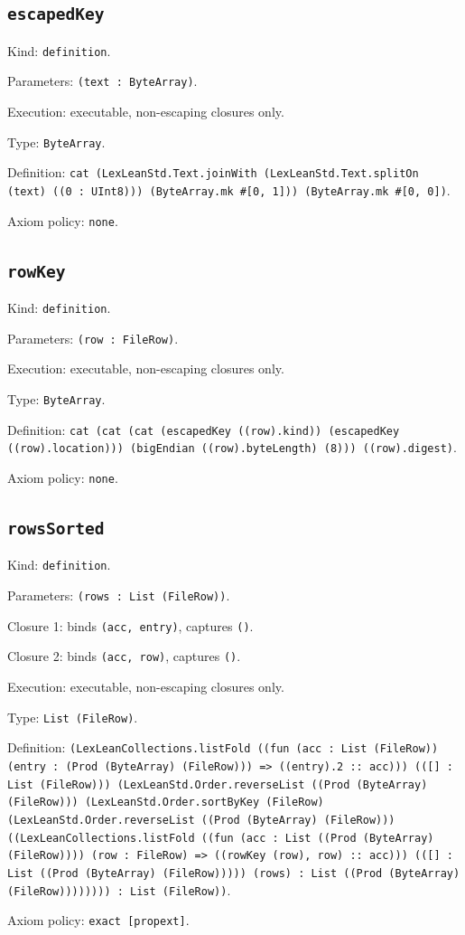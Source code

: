 \documentclass[11pt]{article}
\begin{document}
\subsection*{\texttt{escapedKey}}
\noindent Kind: \texttt{definition}.\par
\noindent Parameters: \texttt{(text : ByteArray)}.\par
\noindent Execution: executable, non-escaping closures only.\par
\noindent Type: \texttt{ByteArray}.\par
\noindent Definition: \texttt{cat (LexLeanStd.Text.joinWith (LexLeanStd.Text.splitOn (text) ((0 : UInt8))) (ByteArray.mk \#[0, 1])) (ByteArray.mk \#[0, 0])}.\par
\noindent Axiom policy: \texttt{none}.\par
\subsection*{\texttt{rowKey}}
\noindent Kind: \texttt{definition}.\par
\noindent Parameters: \texttt{(row : FileRow)}.\par
\noindent Execution: executable, non-escaping closures only.\par
\noindent Type: \texttt{ByteArray}.\par
\noindent Definition: \texttt{cat (cat (cat (escapedKey ((row).kind)) (escapedKey ((row).location))) (bigEndian ((row).byteLength) (8))) ((row).digest)}.\par
\noindent Axiom policy: \texttt{none}.\par
\subsection*{\texttt{rowsSorted}}
\noindent Kind: \texttt{definition}.\par
\noindent Parameters: \texttt{(rows : List (FileRow))}.\par
\noindent Closure 1: binds \texttt{(acc, entry)}, captures \texttt{()}.\par
\noindent Closure 2: binds \texttt{(acc, row)}, captures \texttt{()}.\par
\noindent Execution: executable, non-escaping closures only.\par
\noindent Type: \texttt{List (FileRow)}.\par
\noindent Definition: \texttt{(LexLeanCollections.listFold ((fun (acc : List (FileRow)) (entry : (Prod (ByteArray) (FileRow))) => ((entry).2 :: acc))) (([] : List (FileRow))) (LexLeanStd.Order.reverseList ((Prod (ByteArray) (FileRow))) (LexLeanStd.Order.sortByKey (FileRow) (LexLeanStd.Order.reverseList ((Prod (ByteArray) (FileRow))) ((LexLeanCollections.listFold ((fun (acc : List ((Prod (ByteArray) (FileRow)))) (row : FileRow) => ((rowKey (row), row) :: acc))) (([] : List ((Prod (ByteArray) (FileRow))))) (rows) : List ((Prod (ByteArray) (FileRow)))))))) : List (FileRow))}.\par
\noindent Axiom policy: \texttt{exact [propext]}.\par
\end{document}
